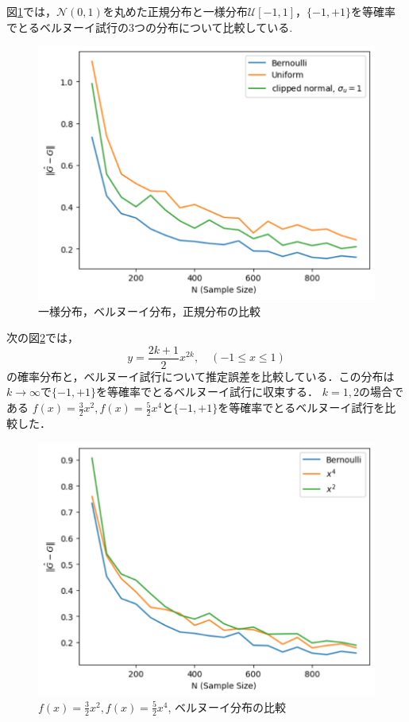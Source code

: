 図\ref{u_vs_n_vs_b}では，$\mathcal{N}(0, 1)$を丸めた正規分布と一様分布$\mathcal{U}[-1, 1]$，$\{-1, +1\}$を等確率でとるベルヌーイ試行の3つの分布について比較している.
\begin{figure}[htbp]
    \centering
    \includegraphics[width=0.8\linewidth]{figure/figure3.pdf}
    \caption{一様分布，ベルヌーイ分布，正規分布の比較}
    \label{u_vs_n_vs_b}
\end{figure}

次の図\ref{x^n}では，
\begin{equation*}
    y = \frac{2k+1}{2}x^{2k}, \quad (-1 \leq x\leq 1)
\end{equation*}
の確率分布と，ベルヌーイ試行について推定誤差を比較している．この分布は$k \to \infty$で$\{-1,+1\}$を等確率でとるベルヌーイ試行に収束する．
$k = 1, 2$の場合である
$f(x) = \frac{3}{2}x^2, f(x) = \frac{5}{2}x^4$と$\{-1, +1\}$を等確率でとるベルヌーイ試行を比較した．

\begin{figure}[htbp]
    \centering
    \includegraphics[width=0.8\linewidth]{figure/figure4.pdf}
    \caption{$f(x) = \frac{3}{2}x^2, f(x) = \frac{5}{2}x^4$, ベルヌーイ分布の比較}
    \label{x^n}
\end{figure}

